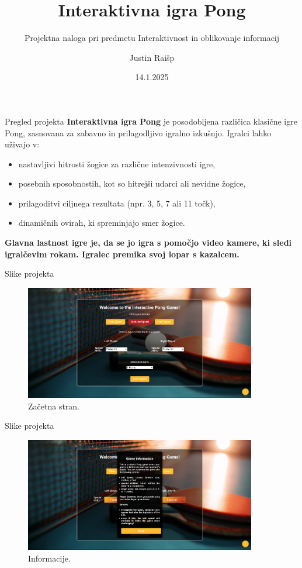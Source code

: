 \documentclass{beamer}
\title{Interaktivna igra Pong}
\subtitle{Projektna naloga pri predmetu Interaktivnost in oblikovanje informacij}
\author{Justin Raišp}
\date{14.1.2025}
\begin{document}
\begin{frame}
    \titlepage
\end{frame}

\begin{frame}{Pregled projekta}
    \textbf{Interaktivna igra Pong} je posodobljena različica klasične igre Pong, zasnovana za zabavno in prilagodljivo igralno izkušnjo. Igralci lahko uživajo v:
    \begin{itemize}
        \item nastavljivi hitrosti žogice za različne intenzivnosti igre,
        \item posebnih sposobnostih, kot so hitrejši udarci ali nevidne žogice,
        \item prilagoditvi ciljnega rezultata (npr. 3, 5, 7 ali 11 točk),
        \item dinamičnih ovirah, ki spreminjajo smer žogice.
    \end{itemize}
    \textbf{Glavna lastnost igre je, da se jo igra s pomočjo video kamere, ki sledi igralčevim rokam. Igralec premika svoj lopar s kazalcem.}
\end{frame}


\begin{frame}{Slike projekta}
  \begin{figure}
      \centering
      \includegraphics[width=0.9\textwidth]{images/homePage.png}
      \caption{Začetna stran.}
      \label{fig:interface}
  \end{figure}
\end{frame}

\begin{frame}{Slike projekta}
  \begin{figure}
      \centering
      \includegraphics[width=0.9\textwidth]{images/info.png}
      \caption{Informacije.}
      \label{fig:interface}
  \end{figure}
\end{frame}
\end{document}
